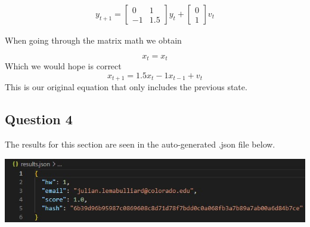 \documentclass[conf]{new-aiaa}
\begin{document}
\begin{enumerate}[label = \alph*)]
\begin{gather}
    y_{t+1}
    =
    \begin{bmatrix}
        0 & 1\\
        -1 & 1.5
    \end{bmatrix}
    y_t + 
    \begin{bmatrix}
        0\\
        1
    \end{bmatrix}
    v_t
\end{gather}

When going through the matrix math we obtain

\[x_t = x_t\] Which we would hope is correct
\[x_{t+1} = 1.5 x_t - 1 x_{t-1} + v_t\] This is our original equation that only includes the previous state. 

\end{enumerate}

\subsection{Question 4}

The results for this section are seen in the auto-generated .json file below. 

\includegraphics[]{json.jpg}
\end{document}
